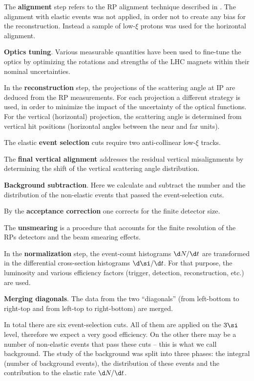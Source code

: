 
\> The {\bf alignment} step refers to the RP alignment technique described in . The alignment with elastic events was not applied, in order not to create any bias for the reconstruction. Instead a sample of low-$\xi$ protons was used for the horizontal alignment.

\> {\bf Optics tuning}. Various measurable quantities have been used to fine-tune the optics by optimizing the rotations and strengths of the LHC magnets within their nominal uncertainties.

\> In the {\bf reconstruction} step, the projections of the scattering angle at IP are deduced from the RP measurements. For each projection a different strategy is used, in order to minimize the impact of the uncertainty of the optical functions. For the vertical (horizontal) projection, the scattering angle is determined from vertical hit positions (horizontal angles between the near and far units).

\> The elastic {\bf event selection} cuts require two anti-collinear low-$\xi$ tracks.

\> The {\bf final vertical alignment} addresses the residual vertical misalignments by determining the shift of the vertical scattering angle distribution.

\> {\bf Background subtraction}. Here we calculate and subtract the number and the distribution of the non-elastic events that passed the event-selection cuts.

\> By the {\bf acceptance correction} one corrects for the finite detector size.

\> The {\bf unsmearing} is a procedure that accounts for the finite resolution of the RPs detectors and the beam smearing effects.

\> In the {\bf normalization} step, the event-count histograms $\d N/\d t$ are transformed in the differential cross-section histograms $\d\si/\d t$. For that purpose, the luminosity and various efficiency factors (trigger, detection, reconstruction, etc.) are used.

\> {\bf Merging diagonals}. The data from the two ``diagonals'' (from left-bottom to right-top and from left-top to right-bottom) are merged.

\vskip1mm

In total there are six event-selection cuts. All of them are applied on the $3\si$ level, therefore we expect a very good efficiency. On the other there may be a number of non-elastic events that pass these cuts -- this is what we call background. The study of the background was split into three phases: the integral (number of background events), the distribution of these events and the contribution to the elastic rate $\d N/\d t$.

